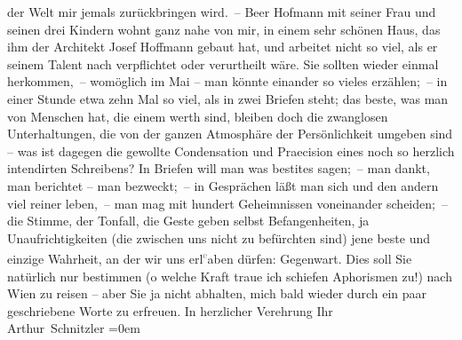 \begin{ledgroupsized}[t]{13cm}
               der Welt mir jemals zurückbringen wird. –\pend
           \pstart
           {\pb}Beer Hofmann mit seiner Frau und seinen drei Kindern wohnt ganz nahe
               von mir, in einem sehr schönen Haus, das ihm der Architekt Josef
                  Hoffmann gebaut hat, und arbeitet nicht so viel, als er seinem Talent nach
               verpflichtet oder verurtheilt wäre. Sie sollten wieder einmal herkommen, – womöglich
               im Mai – man könnte einander so vieles erzählen; – in einer Stunde etwa zehn Mal so
               viel, als in zwei Briefen steht; das beste, was man von Menschen hat, die einem werth
               sind, bleiben doch die zwanglosen Unterhaltungen, die von der ganzen Atmosphäre der
               Persönlichkeit umgeben sind – was ist dagegen die gewollte Condensation und
               Praecision eines noch so herzlich intendirten Schreibens? {\pb}In Briefen will man was besti{\geminationm}tes sagen; – man dankt, man berichtet – man bezweckt; –
               in Gesprächen läßt man sich und den andern viel reiner leben, – man mag mit hundert
               Geheimnissen voneinander scheiden; – die Stimme, der Tonfall, die Geste geben selbst
               Befangenheiten, ja Unaufrichtigkeiten (die zwischen uns nicht zu befürchten sind)
               jene beste und einzige Wahrheit, an der wir uns erl\substVorne{}\textsuperscript{\textcolor{gray}{e}}\substDazwischen{}a\substHinten{}ben dürfen: Gegenwart.\pend
           \pstart
           Dies soll Sie natürlich nur bestimmen (o welche Kraft traue ich schiefen Aphorismen
               zu!) nach Wien zu reisen – aber Sie ja nicht
               abhalten, mich bald wieder durch ein paar geschriebene Worte zu erfreuen. In
               herzlicher Verehrung\pend
           \pstart
           Ihr{\\[\baselineskip]}\spacefill\mbox{Arthur Schnitzler}\pend
           \leftskip=0em{}
         
         \endnumbering{}\end{ledgroupsized}  \newcommand{\dateiname}{L02000}\newcommand{\titel}{Arthur Schnitzler an Georg Brandes, 19. 1. 1911}\newcommand{\editorInnen}{Martin Anton Müller und Gerd-Hermann Susen}
      